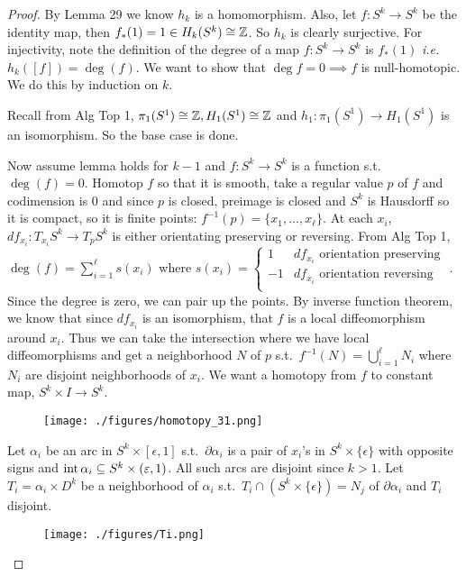 \documentclass[12pt,class=article,crop=false]{standalone}
\begin{document}
\begin{proof}
	By Lemma 29 we know $ h_k$ is a homomorphism. Also, let $ f: S^{k} \to S^{k}$ be the identity map, then $ f_*(1) =1 \in H_k(S^{k}) \cong \mathbb{Z}$. So $ h_k$ is clearly surjective. For injectivity, note the definition of the degree of a map $ f: S^{k} \to S^{k}$ is $ f_*(1)$  \emph{i.e.} $ h_k([f])  = \deg (f)$. We want to show that $ \deg f = 0 \implies f$ is null-homotopic. We do this by induction on $ k$.

	Recall from Alg Top 1,  $\pi_1(S^{1}) \cong \mathbb{Z}, H_1(S^{1}) \cong \mathbb{Z}$ and $ h_1: \pi_1(S^{1}) \to H_1(S^{1})$ is an isomorphism. So the base case is done.

Now assume lemma holds for $k-1$ and $ f: S^{k} \to S^{k}$ is a function s.t.\ $ \deg(f) = 0$. Homotop $ f$ so that it is smooth, take a regular value  $ p$ of $ f$ and codimension is 0 and since $ p$ is closed, preimage is closed and  $ S^{k}$ is Hausdorff so it is compact, so it is finite points: $ f^{-1}(p) = \{x_1,\ldots,x_\ell\} $. At each $ x_i$, $ df_{x_i} : T_{x_i} S^{k} \to T_p S^{k}$ is either orientating preserving or reversing. From Alg Top 1, $ \deg(f) = \sum_{ i= 1}^{ \ell} s(x_i)$ where $ s(x_i) = \begin{cases}
	1 & df_{x_i} \text{ orientation preserving}\\
	-1 & df_{x_i} \text{ orientation reversing}\\
\end{cases}$ 
. Since the degree is zero, we can pair up the points. By inverse function theorem, we know that since $ df_{x_i}$ is an isomorphism, that $ f$ is a local diffeomorphism around  $ x_i$. Thus we can take the intersection where we have local diffeomorphisms and get a neighborhood $ N$ of  $ p$  s.t.\ $ f^{-1}(N) = \bigcup_{ i= 1}^{\ell} N_i $ where $ N_i$ are disjoint neighborhoods of $ x_i$. We want a homotopy from $ f$ to constant map, $ S^{k} \times I \to S^{k}$. 
~\begin{figure}[H]
	\centering
	\texttt{[image: ./figures/homotopy\_31.png]}
\end{figure}
Let $ \alpha_i$ be an arc in $ S^{k} \times [ \epsilon,1]$ s.t.\ $ \partial \alpha_i$ is a pair of $ x_i$'s in $ S^{k} \times \{\epsilon\}$ with opposite signs and $ \operatorname{int} \alpha_i \subseteq S^{k} \times ( \varepsilon,1)$. All such arcs are disjoint since $ k>1$. Let  $ T_i = \alpha_i \times D^{k}$ be a neighborhood of $ \alpha_i$ s.t.\ $ T_i \cap (S^{k} \times \{ \epsilon\} )= N_j$ of $ \partial \alpha_i$ and $ T_i$ disjoint.
~\begin{figure}[H]
	\centering
	\texttt{[image: ./figures/Ti.png]}
\end{figure}


\end{proof}
\end{document}

